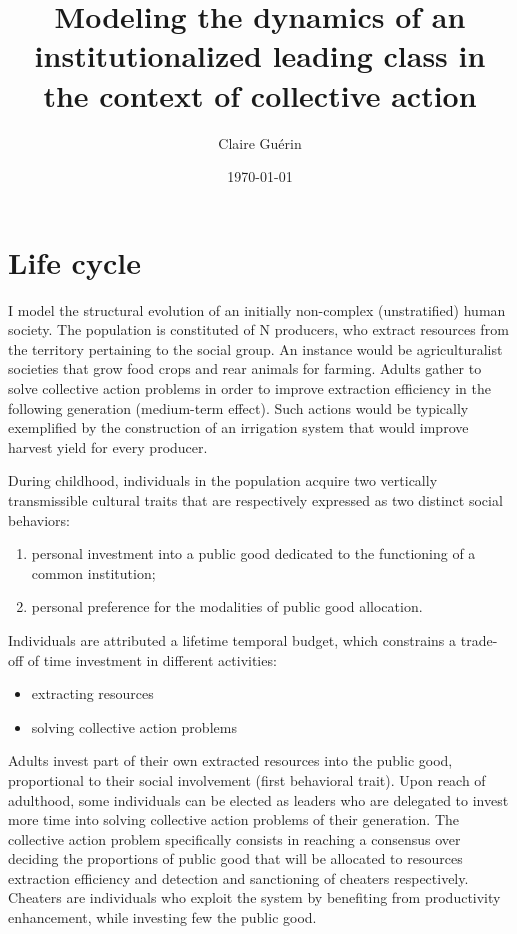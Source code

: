\documentclass[a4paper]{article}
\title{Modeling the dynamics of an institutionalized leading class in the context of collective action}
\author{Claire Gu\'{e}rin}
\date{\today}
\begin{document}
\maketitle

\section{Life cycle}
\label{sec:lifcyc}

I model the structural evolution of an initially non-complex (unstratified) human society. The population is constituted of N producers, who extract resources from the territory pertaining to the social group. An instance would be agriculturalist societies that grow food crops and rear animals for farming. Adults gather to solve collective action problems in order to improve extraction efficiency in the following generation (medium-term effect). Such actions would be typically exemplified by the construction of an irrigation system that would improve harvest yield for every producer. 

During childhood, individuals in the population acquire two vertically transmissible cultural traits that are respectively expressed as two distinct social behaviors:

\begin{enumerate}
	\item personal investment into a public good dedicated to the functioning of a common institution;
	\item personal preference for the modalities of public good allocation.
\end{enumerate} 

Individuals are attributed a lifetime temporal budget, which constrains a trade-off of time investment in different activities:

\begin{itemize}
	\item extracting resources
	\item solving collective action problems
\end{itemize}
	
Adults invest part of their own extracted resources into the public good, proportional to their social involvement (first behavioral trait). 
Upon reach of adulthood, some individuals can be elected as leaders who are delegated to invest more time into solving collective action problems of their generation. The collective action problem specifically consists in reaching a consensus over deciding the proportions of public good that will be allocated to resources extraction efficiency and detection and sanctioning of cheaters respectively. Cheaters are individuals who exploit the system by benefiting from productivity enhancement, while investing few the public good.  
\end{document}
